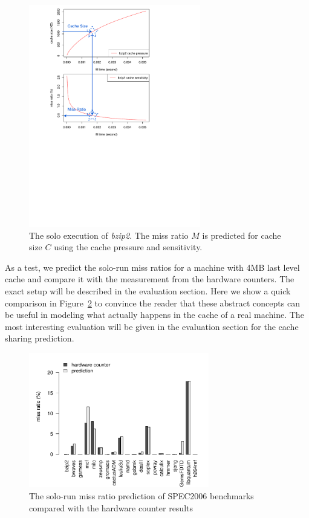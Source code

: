 \begin{figure}[h!]
\centering
\includegraphics[width=7.5cm,type=pdf,ext=.pdf,read=.pdf]{figures/corun/bzip2_compute_mr}
\caption{The solo execution of \emph{bzip2}.  The miss ratio $M$ is predicted for cache size $C$ using the cache pressure and sensitivity. }
\label{fig:bzip2_compute_mr}
\end{figure}

As a test, we predict the solo-run miss ratios for a machine with 4MB
last level cache and compare it with the measurement from the hardware
counters.  The exact setup will be described in the evaluation
section.  Here we show a quick comparison in
Figure~\ref{fig:seq_mr_comp} to convince the reader that these
abstract concepts can be useful in modeling what actually happens in
the cache of a real machine.  The most interesting evaluation will be
given in the evaluation section for the cache sharing prediction.

\begin{figure}[h!]
\centering
\includegraphics[width=0.7\textwidth,type=pdf,ext=.pdf,read=.pdf]{figures/corun/seq_mr_comp}
\caption{The solo-run miss ratio prediction of SPEC2006 benchmarks
  compared with the hardware counter results}
\label{fig:seq_mr_comp}
\end{figure}

